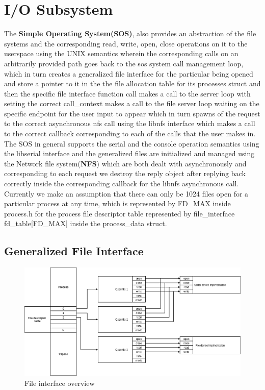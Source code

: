 \section{I/O Subsystem}

\noindent
The \textbf{Simple Operating System(SOS)}, also provides an abstraction of the file systems and the corresponding read, write, open, close operations on it to the userspace using the UNIX semantics
wherein the corresponding calls on an arbitrarily provided path goes back to the sos system call management loop, which in turn creates a generalized file interface for the particular being opened and store a pointer to it in the 
the file allocation table for its processes struct and then the specific file interface function call makes a call to the server loop with setting the correct call\_context makes a call to the file server loop waiting on the specific endpoint for the user input to appear 
which in turn spawns of the request to the correct asynchronous nfs call using the libnfs interface which makes a call to the correct callback corresponding to each of the calls that the user makes in.
\\

\noindent The SOS in general supports the serial and the console operation semantics using the libserial interface and the generalized files are initialized and managed using the 
Network file system(\textbf{NFS}) which are both dealt with asynchronously and corresponding to each request we destroy the reply object after replying back correctly
inside the corresponding callback for the libnfs asynchronous call.
\\

\noindent
Currently we make an assumption that there can only be 1024 files open for a particular process at any time, which is represented by FD\_MAX inside 
process.h for the process file descriptor table represented by file\_interface fd\_table[FD\_MAX] inside the process\_data struct.
\\

\subsection{Generalized File Interface}


\begin{figure}[h]
    \includegraphics[width=\linewidth]{file_interface.png}
    \caption{File interface overview}
    \label{fig:file_interface}
\end{figure}

